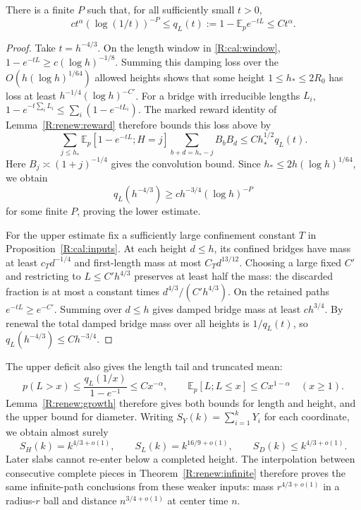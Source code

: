 \begin{lemma}\label{R:cal:deficit}
There is a finite $P$ such that, for all sufficiently small $t>0$,
\[
 c t^\alpha(\log(1/t))^{-P}
 \le q_L(t):=1-\mathbb E_p e^{-tL}\le C t^\alpha.
\]
\end{lemma}
\begin{proof}
Take $t=h^{-4/3}$. On the length window in \eqref{R:cal:window},
$1-e^{-tL}\ge c(\log h)^{-1/8}$. Summing this damping loss over the
$O(h(\log h)^{1/64})$ allowed heights shows that some height
$1\le h_*\le2R_0$ has loss at least $h^{-1/4}(\log h)^{-C'}$.
For a bridge with irreducible lengths $L_i$,
$1-e^{-t\sum_iL_i}\le\sum_i(1-e^{-tL_i})$.
The marked reward identity of Lemma~\ref{R:renew:reward} therefore bounds
this loss above by
\[
 \sum_{j\le h_*}\mathbb E_p[1-e^{-tL};H=j]
                 \sum_{b+d=h_*-j}B_bB_d
 \le C h_*^{1/2}q_L(t).
\]
Here $B_j\asymp(1+j)^{-1/4}$ gives the convolution bound. Since
$h_*\le2h(\log h)^{1/64}$, we obtain
\[
 q_L(h^{-4/3})\ge c h^{-3/4}(\log h)^{-P}
\]
for some finite $P$, proving the lower estimate.

For the upper estimate fix a sufficiently large confinement constant $T$
in Proposition~\ref{R:cal:inputs}. At each height $d\le h$, its confined
bridges have mass at least $c_Td^{-1/4}$ and first-length mass at most
$C_Td^{13/12}$. Choosing a large fixed $C'$ and restricting to
$L\le C'h^{4/3}$ preserves at least half the mass: the discarded fraction
is at most a constant times $d^{4/3}/(C'h^{4/3})$. On the retained paths
$e^{-tL}\ge e^{-C'}$. Summing over $d\le h$ gives damped bridge mass at
least $c h^{3/4}$. By renewal the total damped bridge mass over all heights
is $1/q_L(t)$, so $q_L(h^{-4/3})\le Ch^{-3/4}$.
\end{proof}

The upper deficit also gives the length tail and truncated mean:
\[
 p(L>x)\le\frac{q_L(1/x)}{1-e^{-1}}\le Cx^{-\alpha},\qquad
 \mathbb E_p[L;L\le x]\le Cx^{1-\alpha}\quad(x\ge1).
\]
Lemma~\ref{R:renew:growth} therefore gives both bounds for length and
height, and the upper bound for diameter. Writing
$S_Y(k)=\sum_{i=1}^kY_i$ for each coordinate,
we obtain almost surely
\[
 S_H(k)=k^{4/3+o(1)},\qquad S_L(k)=k^{16/9+o(1)},\qquad
 S_D(k)\le k^{4/3+o(1)}.
\]
Later slabs cannot re-enter below a completed height. The interpolation
between consecutive complete pieces in Theorem~\ref{R:renew:infinite}
therefore proves the same infinite-path conclusions from these weaker
inputs: mass $r^{4/3+o(1)}$ in a radius-$r$ ball and distance
$n^{3/4+o(1)}$ at center time $n$.

